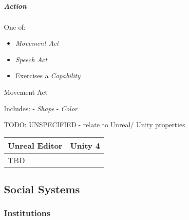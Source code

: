 \documentclass[]{article}
\begin{document}
\subparagraph{Action}\label{action}

One of:

\begin{itemize}
\item
  \emph{Movement Act}
\item
  \emph{Speech Act}
\item
  Exercises a \emph{Capability}
\end{itemize}

Movement Act


Includes: - \emph{Shape} - \emph{Color}

TODO: UNSPECIFIED - relate to Unreal/ Unity properties

\begin{longtable}[c]{@{}ll@{}}
\toprule
\begin{minipage}[b]{0.29\columnwidth}\raggedright\strut
Unreal Editor
\strut\end{minipage} &
\begin{minipage}[b]{0.22\columnwidth}\raggedright\strut
Unity 4
\strut\end{minipage}\tabularnewline
\midrule
\endhead
\begin{minipage}[t]{0.29\columnwidth}\raggedright\strut
TBD
\strut\end{minipage} &
\begin{minipage}[t]{0.22\columnwidth}\raggedright\strut
\strut\end{minipage}\tabularnewline
\bottomrule
\end{longtable}

\subsection{Social Systems}\label{socialux5fsystem}

\subsubsection{Institutions}\label{institutions}
\end{document}
